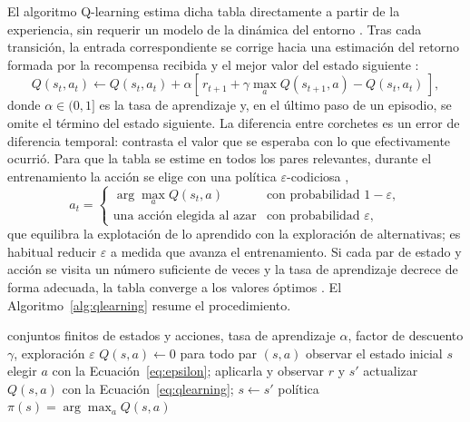 El algoritmo Q-learning estima dicha tabla directamente a partir de la experiencia, sin requerir un modelo de la dinámica del entorno \cite{watkins1992qlearning}.
Tras cada transición, la entrada correspondiente se corrige hacia una estimación del retorno formada por la recompensa recibida y el mejor valor del estado siguiente \cite{sutton2018rl}:
\begin{equation}
Q(s_t,a_t) \leftarrow Q(s_t,a_t) + \alpha \left[\, r_{t+1} + \gamma \max_{a} Q(s_{t+1},a) - Q(s_t,a_t) \,\right],
\label{eq:qlearning}
\end{equation}
donde $\alpha \in (0,1]$ es la tasa de aprendizaje y, en el último paso de un episodio, se omite el término del estado siguiente.
La diferencia entre corchetes es un error de diferencia temporal: contrasta el valor que se esperaba con lo que efectivamente ocurrió.
Para que la tabla se estime en todos los pares relevantes, durante el entrenamiento la acción se elige con una política $\varepsilon$-codiciosa \cite{sutton2018rl},
\begin{equation}
a_t =
\begin{cases}
\arg\max_{a} Q(s_t,a) & \text{con probabilidad } 1-\varepsilon,\\
\text{una acción elegida al azar} & \text{con probabilidad } \varepsilon,
\end{cases}
\label{eq:epsilon}
\end{equation}
que equilibra la explotación de lo aprendido con la exploración de alternativas; es habitual reducir $\varepsilon$ a medida que avanza el entrenamiento.
Si cada par de estado y acción se visita un número suficiente de veces y la tasa de aprendizaje decrece de forma adecuada, la tabla converge a los valores óptimos \cite{watkins1992qlearning}.
El Algoritmo~\ref{alg:qlearning} resume el procedimiento.

\begin{algorithm}[H]
\caption[Q-learning tabular]{Q-learning tabular por episodios. Fuente: elaboración propia con base en~\cite{watkins1992qlearning,sutton2018rl}.}
\label{alg:qlearning}
\begin{algorithmic}[1]
\REQUIRE conjuntos finitos de estados y acciones, tasa de aprendizaje $\alpha$, factor de descuento $\gamma$, exploración $\varepsilon$
\STATE $Q(s,a) \leftarrow 0$ para todo par $(s,a)$
  \STATE observar el estado inicial $s$
    \STATE elegir $a$ con la Ecuación~\eqref{eq:epsilon}; aplicarla y observar $r$ y $s'$
    \STATE actualizar $Q(s,a)$ con la Ecuación~\eqref{eq:qlearning}; \; $s \leftarrow s'$
  \ENDWHILE
\ENDFOR
\ENSURE política $\pi(s) = \arg\max_{a} Q(s,a)$
\end{algorithmic}
\end{algorithm}

